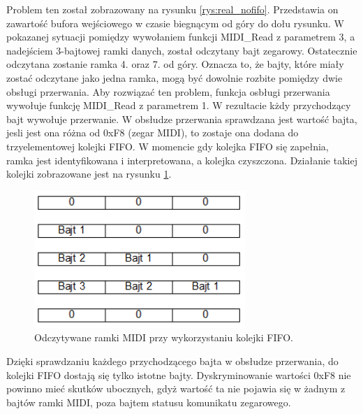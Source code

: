 Problem ten został zobrazowany na rysunku \ref{rys:real_nofifo}. Przedstawia on zawartość bufora wejściowego w czasie biegnącym od góry do dołu rysunku. W pokazanej sytuacji pomiędzy wywołaniem funkcji MIDI\_Read z parametrem 3, a nadejściem 3-bajtowej ramki danych, został odczytany bajt zegarowy. Ostatecznie odczytana zostanie ramka 4. oraz 7. od góry.  Oznacza to, że bajty, które miały zostać odczytane jako jedna ramka, mogą być dowolnie rozbite pomiędzy dwie obsługi przerwania. 
Aby rozwiązać ten problem, funkcja osbługi przerwania wywołuje funkcję MIDI\_Read z parametrem 1. W rezultacie kżdy przychodzący bajt wywołuje przerwanie. W obsłudze przerwania sprawdzana jest wartość bajta, jesli jest ona różna od 0xF8 (zegar MIDI), to zostaje ona dodana do trzyelementowej kolejki FIFO. W momencie gdy kolejka FIFO się zapełnia, ramka jest identyfikowana i interpretowana, a kolejka czyszczona. Działanie takiej kolejki zobrazowane jest na rysunku \ref{rys:real_fifo}.
\begin{figure}[H]
	\centering
	\includegraphics[width=8cm]{./grafiki/real_fifo}
	\captionsetup{justification=centering}
	\caption{Odczytywane ramki MIDI przy wykorzystaniu kolejki FIFO.}
	\label{rys:real_fifo}
\end{figure} 
Dzięki sprawdzaniu każdego przychodzącego bajta w obsłudze przerwania, do kolejki FIFO dostają się tylko istotne bajty. Dyskryminowanie wartości 0xF8 nie powinno mieć skutków ubocznych, gdyż wartość ta nie pojawia się w żadnym z bajtów ramki MIDI, poza bajtem statusu komunikatu zegarowego.

